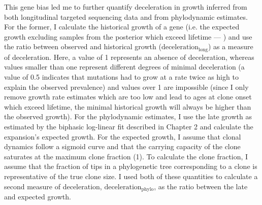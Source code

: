 \begin{figure}[!ht]
	\label{fig:exceeds-within-lifetime}
\end{figure}

\begin{figure}[!ht]
	\label{fig:fraction-clones-exceeding-lifetime}
\end{figure}

This gene bias led me to further quantify deceleration in growth inferred from both longitudinal targeted sequencing data and from phylodynamic estimates. For the former, I calculate the historical growth of a gene (i.e. the expected growth excluding samples from the posterior which exceed lifetime --- ) and use the ratio between observed and historical growth ($\mathrm{deceleration}_{\mathrm{long}}$) as a measure of deceleration. Here, a value of 1 represents an absence of deceleration, whereas values smaller than one represent different degrees of minimal deceleration (a value of 0.5 indicates that mutations had to grow at a rate twice as high to explain the observed prevalence) and values over 1 are impossible (since I only remove growth rate estimates which are too low and lead to ages at clone onset which exceed lifetime, the minimal historical growth will always be higher than the observed growth). For the phylodynamic estimates, I use the late growth as estimated by the biphasic log-linear fit described in Chapter 2 and calculate the expansion's expected growth. For the expected growth, I assume that clonal dynamics follow a sigmoid curve and that the carrying capacity of the clone saturates at the maximum clone fraction (1). To calculate the clone fraction, I assume that the fraction of tips in a phylogenetic tree corresponding to a clone is representative of the true clone size. I used both of these quantities to calculate a second measure of deceleration, $\mathrm{deceleration}_{\mathrm{phylo}}$, as the ratio between the late and expected growth.

